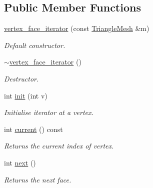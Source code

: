 \subsection*{Public Member Functions}
\begin{DoxyCompactItemize}
\item 
\hyperlink{classgeoproc_1_1iterators_1_1vertex_1_1vertex__face__iterator_ad45cd64b9e5a3321ac6344984c7cf564}{vertex\+\_\+face\+\_\+iterator} (const \hyperlink{classgeoproc_1_1TriangleMesh}{Triangle\+Mesh} \&m)
\begin{DoxyCompactList}\small\item\em Default constructor. \end{DoxyCompactList}\item 
\mbox{\label{classgeoproc_1_1iterators_1_1vertex_1_1vertex__face__iterator_ad3c9661cf4eeb062fd22fc0f4820ba2c}} 
\hyperlink{classgeoproc_1_1iterators_1_1vertex_1_1vertex__face__iterator_ad3c9661cf4eeb062fd22fc0f4820ba2c}{$\sim$vertex\+\_\+face\+\_\+iterator} ()
\begin{DoxyCompactList}\small\item\em Destructor. \end{DoxyCompactList}\item 
int \hyperlink{classgeoproc_1_1iterators_1_1vertex_1_1vertex__face__iterator_a713d8d9edb7121c729b5717261fd8b3b}{init} (int v)
\begin{DoxyCompactList}\small\item\em Initialise iterator at a vertex. \end{DoxyCompactList}\item 
int \hyperlink{classgeoproc_1_1iterators_1_1vertex_1_1vertex__face__iterator_aa75fe423e210cf4e20e721307c80f6fb}{current} () const
\begin{DoxyCompactList}\small\item\em Returns the current index of vertex. \end{DoxyCompactList}\item 
int \hyperlink{classgeoproc_1_1iterators_1_1vertex_1_1vertex__face__iterator_aa2a7fb3ee7e703d815e7f1664fbd99d4}{next} ()
\begin{DoxyCompactList}\small\item\em Returns the next face. \end{DoxyCompactList}\end{DoxyCompactItemize}
